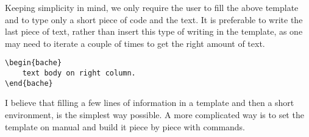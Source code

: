 Keeping simplicity in mind, we only require the user to fill the above template and to type only
a short piece of code and the text. It is preferable to write the last piece of
text, rather than insert this type of writing in the template, as one may need to iterate a 
couple of times to get the right amount of text.
\begin{lstlisting}
\begin{bache}
    text body on right column.
\end{bache}
\end{lstlisting}

I believe that filling a few lines of information in a template and then a short environment, is
the simplest way possible. A more complicated way is to set the template on manual and
build it piece by piece with commands.





\restoregeometry